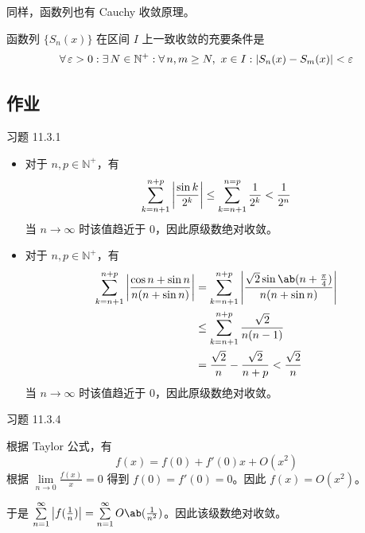 同样，函数列也有 Cauchy 收敛原理。

\begin{theorem}
    函数列 $\{S_n(x)\}$ 在区间 $I$ 上一致收敛的充要条件是
    $$
    \forall\,\varepsilon > 0: \exists\,N \in \mathbb{N}^{+}: \forall\,n, m \ge N,\ x \in I: \abs{S_n(x) - S_m(x)} < \varepsilon
    $$
\end{theorem}

\subsection{作业}

\begin{problem}
    习题 11.3.1
    \begin{solution}
        \begin{itemize}
            \item[\textbf{2)}] 对于 $n, p \in \mathbb{N}^{+}$，有
            $$
            \begin{aligned}
                \sum_{k = n + 1}^{n + p} \abs{\frac{\sin k}{2^{k}}} \le \sum_{k = n + 1}^{n = p} \frac{1}{2^{k}} < \frac{1}{2^{n}}
            \end{aligned}
            $$
            当 $n \to \infty$ 时该值趋近于 $0$，因此原级数绝对收敛。

            \item[\textbf{3)}] 对于 $n, p \in \mathbb{N}^{+}$，有
            $$
            \begin{aligned}
                \sum_{k = n + 1}^{n + p} \abs{\frac{\cos n + \sin n}{n (n + \sin n)}} & = \sum_{k = n + 1}^{n + p} \abs{\frac{\sqrt{2} \sin \ab(n + \frac{\pi}{4})}{n (n + \sin n)}} \\
                & \le \sum_{k = n + 1}^{n + p} \frac{\sqrt{2}}{n (n - 1)} \\
                & = \frac{\sqrt{2}}{n} - \frac{\sqrt{2}}{n + p} < \frac{\sqrt{2}}{n}
            \end{aligned}
            $$
            当 $n \to \infty$ 时该值趋近于 $0$，因此原级数绝对收敛。
        \end{itemize}
    \end{solution}
\end{problem}

\begin{problem}
    习题 11.3.4
    \begin{solution}
        根据 Taylor 公式，有
        $$
        f(x) = f(0) + f'(0) x + O(x^2)
        $$
        根据 $\lim\limits_{n \to 0} \frac{f(x)}{x} = 0$ 得到 $f(0) = f'(0) = 0$。因此 $f(x) = O(x^2)$。

        于是 $\sum\limits_{n = 1}^{\infty} \abs{f(\frac{1}{n})} = \sum\limits_{n = 1}^{\infty} O\ab(\frac{1}{n^2})$。因此该级数绝对收敛。
    \end{solution}
\end{problem}

